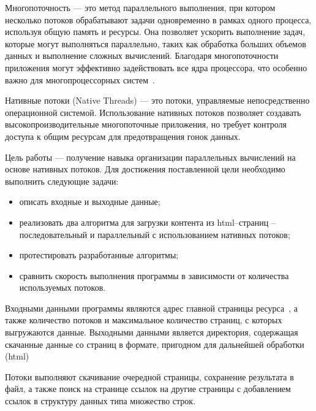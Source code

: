

Многопоточность — это метод параллельного выполнения, при котором несколько потоков обрабатывают
задачи одновременно в рамках одного процесса, используя общую память и ресурсы.
Она позволяет ускорить выполнение задач, которые могут выполняться параллельно,
таких как обработка больших объемов данных и выполнение сложных вычислений.
Благодаря многопоточности приложения могут эффективно задействовать все ядра процессора,
что особенно важно для многопроцессорных систем~\cite{paralel_cpp}.

Нативные потоки (Native Threads) — это потоки, управляемые непосредственно операционной системой.
Использование нативных потоков позволяет создавать высокопроизводительные многопоточные приложения,
но требует контроля доступа к общим ресурсам для предотвращения гонок данных.

Цель работы --- получение навыка организации параллельных вычислений на основе нативных потоков.
Для достижения поставленной цели необходимо выполнить следующие задачи:
\begin{itemize}
    \item[---] описать входные и выходные данные;
    \item[---] реализовать два алгоритма для загрузки контента из html--страниц -- последовательный и параллельный с использованием нативных потоков;
    \item[---] протестировать разработанные алгоритмы;
    \item[---] сравнить скорость выполнения программы в зависимости от количества используемых потоков.
\end{itemize}


Входными данными программы являются адрес главной страницы ресурса~\cite{recepies}, а также количество потоков и максимальное количество страниц, с которых выгружаются данные.
Выходными данными является директория, содержащая скачанные данные со страниц в формате, пригодном для дальнейшей обработки (html)


Потоки выполняют скачивание очередной страницы, сохранение результата в файл,
а также поиск на странице ссылок на другие страницы с добавлением ссылок в структуру данных типа множество строк.

